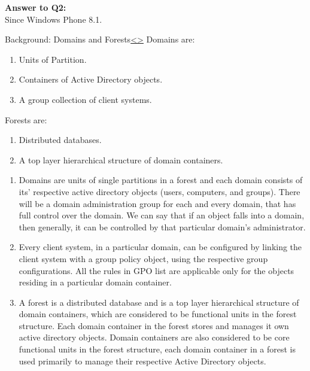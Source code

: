 \documentclass[12pt]{extarticle}
\newenvironment{instructionblock}{\Large\bgroup}{\egroup}
\newcommand{\ben}{\begin{enumerate}}
\newcommand{\een}{\end{enumerate}}
\begin{document}
\vspace{6mm}
\noindent
\textbf{Answer to Q2:}\\
Since Windows Phone 8.1.




\pagebreak
\begin{slide}{Background: Domains and Forests}{\hyperref[slide 9]{\textless}\hyperref[slide 11]{\textgreater}}
\begin{instructionblock}
	Domains are:
\begin{enumerate}
	\item  Units of Partition.
	\item  Containers of Active Directory objects.
	\item  A group collection of client systems.
\end{enumerate}
	Forests are:
\begin{enumerate}
	\item  Distributed databases.
	\item  A top layer hierarchical structure of domain containers.
\end{enumerate}
\end{instructionblock}
\end{slide}


\ben
	\item  Domains are units of single partitions in a forest and each domain consists of its' respective active directory objects (users, computers, and groups). There will be a domain administration group for each and every domain, that has full control over the domain. We can say that if an object falls into a domain, then generally, it can be controlled by that particular domain's administrator.\cite{fordiag}

	\item  Every client system, in a particular domain, can be configured by linking the client system with a group policy object, using the respective group configurations. All the rules in GPO list are applicable only for the objects residing in a particular domain container.

	\item  A forest is a distributed database and is a top layer hierarchical structure of domain containers, which are considered to be functional units in the forest structure. Each domain container in the forest stores and manages it own active directory objects. Domain containers are also considered to be core functional units in the forest structure, each domain container in a forest is used primarily to manage their respective Active Directory objects. 
\een
\end{document}
